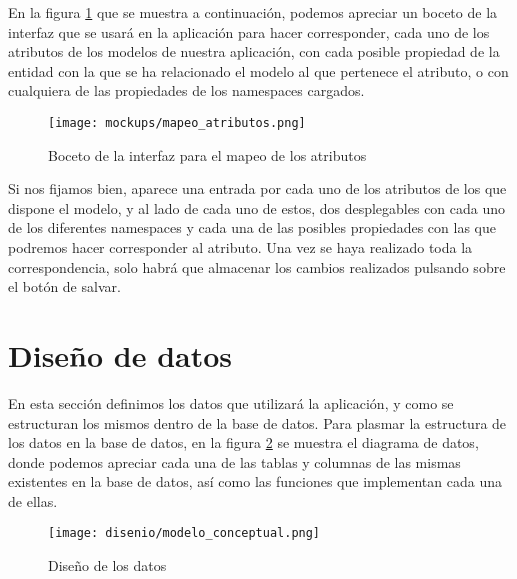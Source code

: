 En la figura \ref{fig:mapeo_atributos} que se muestra a continuación, podemos
apreciar un boceto de la interfaz que se usará en la aplicación para hacer
corresponder, cada uno de los atributos de los modelos de nuestra aplicación,
con cada posible propiedad de la entidad con la que se ha relacionado el modelo
al que pertenece el atributo, o con cualquiera de las propiedades de los
namespaces cargados.

\begin{figure}[H]
    \begin{center}
        \texttt{[image: mockups/mapeo\_atributos.png]}
    \end{center}
    \caption{Boceto de la interfaz para el mapeo de los atributos}
    \label{fig:mapeo_atributos}
\end{figure}

Si nos fijamos bien, aparece una entrada por cada uno de los atributos de los
que dispone el modelo, y al lado de cada uno de estos, dos desplegables con cada
uno de los diferentes namespaces y cada una de las posibles propiedades con las
que podremos hacer corresponder al atributo. Una vez se haya realizado toda la
correspondencia, solo habrá que almacenar los cambios realizados pulsando sobre
el botón de salvar.


\section{Diseño de datos}
En esta sección definimos los datos que utilizará la aplicación, y como se
estructuran los mismos dentro de la base de datos. Para plasmar la estructura de
los datos en la base de datos, en la figura \ref{fig:modelo_conceptual} se
muestra el diagrama de datos, donde podemos apreciar cada una de las tablas y
columnas de las mismas existentes en la base de datos, así como las funciones
que implementan cada una de ellas.

\newpage

\begin{figure}[H]
    \begin{center}
        \texttt{[image: disenio/modelo\_conceptual.png]}
    \end{center}
    \caption{Diseño de los datos}
    \label{fig:modelo_conceptual}
\end{figure}

